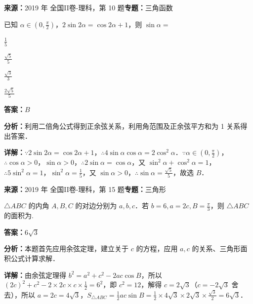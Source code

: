 \begin{question}[points=5]
\textbf{来源：}2019 年 全国II卷-理科，第 10 题\quad \textbf{专题：}三角函数\par
已知 $\alpha\in(0,\frac{\pi}{2})$，$2\sin 2\alpha=\cos 2\alpha+1$，则 $\sin\alpha=$
\begin{choices}
  \item $\frac{1}{5}$
  \item $\frac{\sqrt{5}}{5}$
  \item $\frac{\sqrt{3}}{3}$
  \item $\frac{2\sqrt{5}}{5}$
\end{choices}
\begin{solution}
\textbf{答案：}$B$

\textbf{分析：}利用二倍角公式得到正余弦关系，利用角范围及正余弦平方和为 1 关系得出答案．

\textbf{详解：}$\because 2\sin 2\alpha=\cos 2\alpha+1$，$\therefore 4\sin\alpha\cos\alpha=2\cos^2\alpha$．$\because \alpha\in(0,\frac{\pi}{2})$，$\therefore \cos\alpha>0$，$\sin\alpha>0$，$\therefore 2\sin\alpha=\cos\alpha$，又 $\sin^2\alpha+\cos^2\alpha=1$，$\therefore 5\sin^2\alpha=1$，$\sin^2\alpha=\frac{1}{5}$，又 $\sin\alpha>0$，$\therefore \sin\alpha=\frac{\sqrt{5}}{5}$，故选 $B$．
\end{solution}
\end{question}

\begin{question}[points=5]
\textbf{来源：}2019 年 全国II卷-理科，第 15 题\quad \textbf{专题：}三角形\par
$\triangle ABC$ 的内角 $A,B,C$ 的对边分别为 $a,b,c$．若 $b=6,a=2c,B=\frac{\pi}{3}$，则 $\triangle ABC$ 的面积为.
\fillin[{$6\sqrt{3}$}]
\begin{solution}
\textbf{答案：}$6\sqrt{3}$

\textbf{分析：}本题首先应用余弦定理，建立关于 $c$ 的方程，应用 $a,c$ 的关系、三角形面积公式计算求解．

\textbf{详解：}由余弦定理得 $b^2=a^2+c^2-2ac\cos B$，所以 $(2c)^2+c^2-2\times 2c\times c\times\frac{1}{2}=6^2$，即 $c^2=12$，解得 $c=2\sqrt{3}$（$c=-2\sqrt{3}$ 舍去），所以 $a=2c=4\sqrt{3}$，$S_{\triangle ABC}=\frac{1}{2}ac\sin B=\frac{1}{2}\times 4\sqrt{3}\times 2\sqrt{3}\times\frac{\sqrt{3}}{2}=6\sqrt{3}$．
\end{solution}
\end{question}


